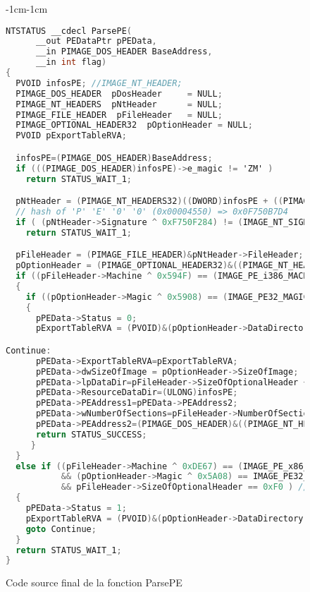 \begin{figure}
\begin{changemargin}{-1cm}{-1cm}
\scriptsize
\begin{lstlisting}[language={C}]
NTSTATUS __cdecl ParsePE(
      __out PEDataPtr pPEData, 
      __in PIMAGE_DOS_HEADER BaseAddress,
      __in int flag)
{
  PVOID infosPE; //IMAGE_NT_HEADER; 
  PIMAGE_DOS_HEADER  pDosHeader     = NULL;
  PIMAGE_NT_HEADERS  pNtHeader      = NULL;
  PIMAGE_FILE_HEADER  pFileHeader   = NULL;
  PIMAGE_OPTIONAL_HEADER32  pOptionHeader = NULL;
  PVOID pExportTableRVA; 

  infosPE=(PIMAGE_DOS_HEADER)BaseAddress; 
  if (((PIMAGE_DOS_HEADER)infosPE)->e_magic != 'ZM' )
    return STATUS_WAIT_1;

  pNtHeader = (PIMAGE_NT_HEADERS32)((DWORD)infosPE + ((PIMAGE_DOS_HEADER)infosPE)->e_lfanew);
  // hash of 'P' 'E' '0' '0' (0x00004550) => 0x0F750B7D4
  if ( (pNtHeader->Signature ^ 0xF750F284) != (IMAGE_NT_SIGNATURE ^ 0xF750F284)) 
    return STATUS_WAIT_1; 

  pFileHeader = (PIMAGE_FILE_HEADER)&pNtHeader->FileHeader;
  pOptionHeader = (PIMAGE_OPTIONAL_HEADER32)&((PIMAGE_NT_HEADERS32)infosPE)->OptionalHeader;
  if ((pFileHeader->Machine ^ 0x594F) == (IMAGE_PE_i386_MACHINE ^ 0x594F)) 
  {
    if ((pOptionHeader->Magic ^ 0x5908) == (IMAGE_PE32_MAGIC ^ 0x5908) && (pFileHeader->SizeOfOptionalHeader == 0xE0 ))  
    {
      pPEData->Status = 0;
      pExportTableRVA = (PVOID)&(pOptionHeader->DataDirectory[IMAGE_DIRECTORY_ENTRY_EXPORT]).VirtualAddress;  

Continue:
      pPEData->ExportTableRVA=pExportTableRVA;     
      pPEData->dwSizeOfImage = pOptionHeader->SizeOfImage;  
      pPEData->lpDataDir=pFileHeader->SizeOfOptionalHeader + (BYTE *)&(pFileHeader->Characteristics) + sizeof(WORD);                                                              
      pPEData->ResourceDataDir=(ULONG)infosPE;                        
      pPEData->PEAddress1=pPEData->PEAddress2;                        
      pPEData->wNumberOfSections=pFileHeader->NumberOfSections;       
      pPEData->PEAddress2=(PIMAGE_DOS_HEADER)&((PIMAGE_NT_HEADERS32)infosPE)->Signature; 
      return STATUS_SUCCESS;
     }
  }
  else if ((pFileHeader->Machine ^ 0xDE67) == (IMAGE_PE_x86_MACHINE ^ 0xDE67) 
           && (pOptionHeader->Magic ^ 0x5A08) == IMAGE_PE32_PLUS_MAGIC 
           && pFileHeader->SizeOfOptionalHeader == 0xF0 ) // 0x5803 64bits
  {
    pPEData->Status = 1;
    pExportTableRVA = (PVOID)&(pOptionHeader->DataDirectory[IMAGE_DIRECTORY_ENTRY_RESOURCE]).VirtualAddress; 
    goto Continue;
  }
  return STATUS_WAIT_1;
}
\end{lstlisting}
\caption{Code source final de la fonction ParsePE\label{fig:AThierry_ParsePEFunction}}
\end{changemargin}
\end{figure}

